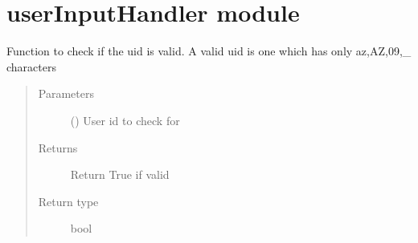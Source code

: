 \documentclass[letterpaper,10pt,english]{sphinxmanual}
\begin{document}
\section{userInputHandler module}
\label{\detokenize{userInputHandler:module-userInputHandler}}\label{\detokenize{userInputHandler:userinputhandler-module}}\label{\detokenize{userInputHandler::doc}}

\begin{fulllineitems}
\label{\detokenize{userInputHandler:userInputHandler.checkValidityOfUID}}
Function to check if the uid is valid. A valid uid is one which has only a\sphinxhyphen{}z,A\sphinxhyphen{}Z,0\sphinxhyphen{}9,\_ characters
\begin{quote}\begin{description}
\item[{Parameters}] \leavevmode
{} () \textendash{} User id to check for

\item[{Returns}] \leavevmode
Return True if valid

\item[{Return type}] \leavevmode
bool

\end{description}\end{quote}

\end{fulllineitems}


\begin{fulllineitems}
\label{\detokenize{userInputHandler:userInputHandler.updateLogs}}
\end{fulllineitems}

\end{document}
